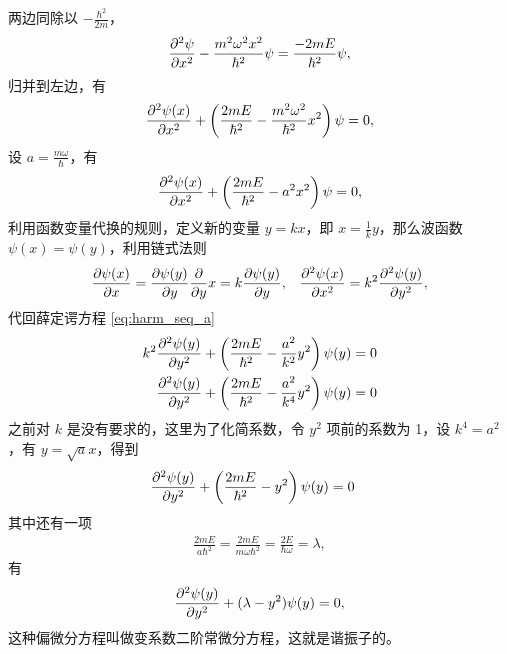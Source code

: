 两边同除以 $-\frac{\hbar^2}{2m}$，
\begin{align}
    \pdv[2]{\psi}{x} - \frac{m^2\omega^2 x^2}{\hbar^2} \psi = \frac{-2mE}{\hbar^2}\psi,
\end{align}
归并到左边，有
\begin{align}
    \pdv[2]{\psi(x)}{x} + \left(
        \frac{2mE}{\hbar^2} - \frac{m^2\omega^2}{\hbar^2} x^2
    \right) \psi = 0,
\end{align}
设 $a = \frac{m\omega}{\hbar}$，有
\begin{align}
    \pdv[2]{\psi(x)}{x} + \left(
        \frac{2mE}{\hbar^2} - a^2 x^2
    \right) \psi = 0,
    \label{eq:harm_seq_a}
\end{align}
利用函数变量代换的规则，定义新的变量 $y = kx$，即 $x = \frac 1k y$，那么波函数 $\psi(x) = \psi(y)$，利用链式法则
\begin{align}
    &\pdv{\psi(x)}{x} = \pdv{\psi(y)}{y} \pdv yx = k \pdv{\psi(y)} {y},
    &\pdv[2]{\psi(x)}{x} = k^2 \pdv[2]{\psi(y)}{y},
\end{align}
代回薛定谔方程 \eqref{eq:harm_seq_a}
\begin{align}
    k^2 \pdv[2]{\psi(y)}{y} + \left(
        \frac{2mE}{\hbar^2} - \frac{a^2}{k^2} y^2
    \right) \psi(y) &= 0 \\
    \pdv[2]{\psi(y)}{y} + \left(
        \frac{2mE}{\hbar^2} - \frac{a^2}{k^4} y^2
    \right) \psi(y) &= 0
\end{align}
之前对 $k$ 是没有要求的，这里为了化简系数，令 $y^2$ 项前的系数为 1，设 $k^4 = a^2$，有 $y = \sqrt a x$，得到
\begin{align}
    \pdv[2]{\psi(y)}{y} + \left(
        \frac{2mE}{\hbar^2} - y^2
    \right) \psi(y) &= 0
\end{align}
其中还有一项
\begin{eqnarray}
    \frac{2mE}{a\hbar^2} = \frac{2mE}{m\omega\hbar^2} = \frac{2E}{\hbar\omega} = \lambda,
\end{eqnarray}
有
\begin{align}
    \pdv[2]{\psi(y)}{y} + (\lambda - y^2) \psi(y) = 0,
    \label{eq:harm_seq_lambda_y}
\end{align}
这种偏微分方程叫做变系数二阶常微分方程，这就是谐振子的。

